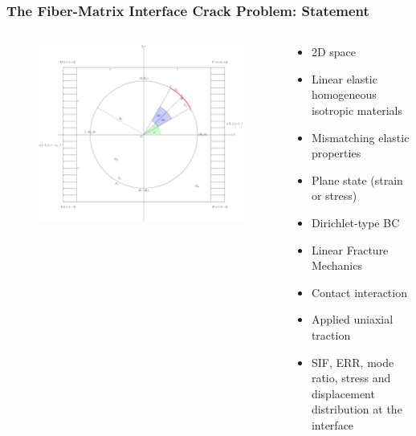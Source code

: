 \documentclass[first,firstsupp,lastsupp,last,hyperref,table]{ETHclass}
\begin{document}
\begin{frame}
\frametitle{\small The Fiber-Matrix Interface Crack Problem: Statement}
\vspace{-0.5cm}
\centering
\begin{columns}
\begin{column}{0.7\textwidth}
\begin{figure}
\includegraphics[width=\columnwidth]{FEMfiberMatrixInterfaceProblem.pdf}
  \label{fig:jintegral}
\end{figure}
\end{column}
\begin{column}{0.3\textwidth}
\scriptsize
\begin{itemize}[label=]
\item 2D space
\item Linear elastic homogeneous isotropic materials
\item Mismatching elastic properties
\item Plane state (strain or stress)
\item Dirichlet-type BC
\item Linear Fracture Mechanics
\item Contact interaction
\item Applied uniaxial traction
\end{itemize}
\begin{itemize}[label=?]
\item SIF, ERR, mode ratio, stress and displacement distribution at the interface
\end{itemize}
\end{column}
\end{columns}
\end{frame}
\end{document}
